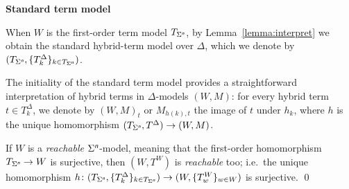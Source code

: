 \documentclass[a4paper,UKenglish,cleveref, autoref]{lipics-v2019}
\newcommand{\keyscript}[1]{\text{\normalfont\sffamily\itshape #1}}
\newcommand{\ari}{\mathit{a\mkern -1mu r}}
\newcommand{\nominal}{\keyscript{n}}
\newcommand{\rigid}{\keyscript{r}}
\newcommand{\flexible}{\keyscript{f}}
\newcommand{\minisec}[1]{%
  \par\addvspace{\smallskipamount}\noindent%
  \textbf{\sffamily #1}\enspace%
}
\begin{document}



\minisec{Standard term model}
When \(W\) is the first-order term model \(T_{\Sigma^{\nominal}}\), by Lemma~\ref{lemma:interpret} we obtain the standard hybrid-term model over \(\Delta\), which we denote by \((T_{\Sigma^{\nominal}}, \{T^{\Delta}_{k}\}_{k \in T_{\Sigma^{\nominal}}})\).

The initiality of the standard term model provides a straightforward interpretation of hybrid terms in \(\Delta\)-models \((W, M)\): for every hybrid term \(t \in T^{\Delta}_{k}\), we denote by \((W, M)_{t}\) or \(M_{h(k), t}\) the image of \(t\) under \(h_{k}\), where \(h\) is the unique homomorphism \((T_{\Sigma^{\nominal}}, T^{\Delta}) \to (W, M)\).

\begin{proposition} 
  \label{proposition:term-model}
  If\/ \(W\) is a \emph{reachable} \(\Sigma^{\nominal}\)-model, meaning that the first-order homomorphism \(T_{\Sigma^{\nominal}} \to W\) is surjective, then \((W, T^{W})\) is \emph{reachable} too; i.e.\ the unique homomorphism \(h \colon (T_{\Sigma^{\nominal}}, \{ T^{\Delta}_{k} \}_{k \in T_{\Sigma^{\nominal}}}) \to (W, \{ T^{W}_{w} \}_{w \in W})\) is surjective.
  \qed
\end{proposition}
\end{document}
